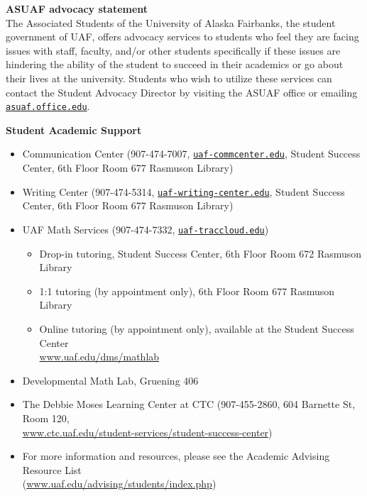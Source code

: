 \documentclass[12pt]{article}
\renewcommand{\emph}[1]{\textsf{\textbf{#1}}}
\newcommand{\localhead}[1]{\par\smallskip\textbf{#1} \smallskip\nobreak\\}%
\def\subheading#1{\localhead{\emph{#1}}}
\begin{document}
\subheading{ASUAF advocacy statement} The Associated Students of the University of Alaska Fairbanks, the student government of UAF, offers advocacy services to students who feel they are facing issues with staff, faculty, and/or other students specifically if these issues are hindering the ability of the student to succeed in their academics or go about their lives at the university. Students who wish to utilize these services can contact the Student Advocacy Director by visiting the ASUAF office or emailing \href{mailto:asuaf.office@alaska.edu}{\texttt{asuaf.office\@@alaska.edu}}.


\subheading{Student Academic Support}

\vspace{-9mm}
\begin{itemize}
\setlength\itemsep{0em}
        \item Communication Center (907-474-7007, \href{mailto:uaf-commcenter@alaska.edu}{\texttt{uaf-commcenter\@@alaska.edu}}, Student Success Center, 6th Floor Room 677 Rasmuson Library)
        \item Writing Center (907-474-5314, \href{mailto:uaf-writing-center@alaska.edu}{\texttt{uaf-writing-center\@@alaska.edu}}, Student Success Center, 6th Floor Room 677 Rasmuson Library)
\item UAF Math Services (907-474-7332, \href{mailto:uaf-traccloud@alaska.edu}{\texttt{uaf-traccloud\@@alaska.edu}})

\begin{itemize}
\item Drop-in tutoring, Student Success Center, 6th Floor Room 672 Rasmuson Library

\item 1:1 tutoring (by appointment only), 6th Floor Room 677 Rasmuson Library

\item Online tutoring (by appointment only), available at the Student Success Center \\ \href{https://www.uaf.edu/dms/mathlab/}{www.uaf.edu/dms/mathlab}
\end{itemize}

\item Developmental Math Lab, Gruening 406
\item The Debbie Moses Learning Center at CTC (907-455-2860, 604 Barnette St, Room 120,\\ \href{https://www.ctc.uaf.edu/student-services/student-success-center/}{www.ctc.uaf.edu/student-services/student-success-center})
\item For more information and resources, please see the Academic Advising Resource List \\ (\href{https://www.uaf.edu/advising/students/index.php}{www.uaf.edu/advising/students/index.php})
\end{itemize}
\end{document}
